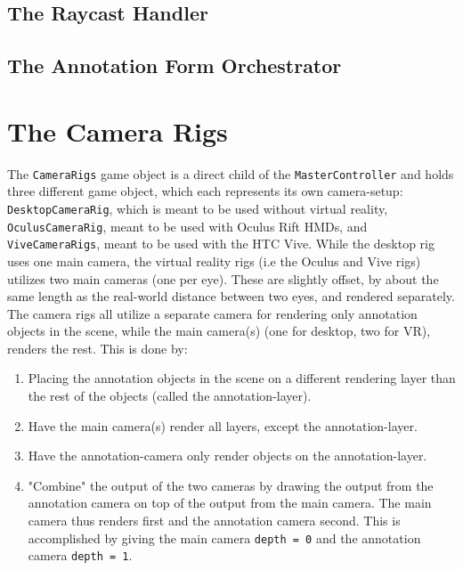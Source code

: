 \subsection{The Raycast Handler}

\subsection{The Annotation Form Orchestrator}



\section{The Camera Rigs}
\label{sec:camera_rigs}
The \texttt{CameraRigs} game object is a direct child of the \texttt{MasterController} and holds three different game object, 
which each represents its own camera-setup: \texttt{DesktopCameraRig}, which is meant to be used
without virtual reality, \texttt{OculusCameraRig}, meant to be used with Oculus Rift HMDs, and \texttt{ViveCameraRigs}, meant to be used with the HTC Vive. 
While the desktop rig uses one main camera, the virtual reality rigs (i.e the Oculus and Vive rigs) utilizes two main cameras (one per eye).
These are slightly offset, by about the same length as the real-world distance between two eyes, and rendered separately.
The camera rigs all utilize a separate camera for rendering only annotation objects in the scene, while the main camera(s) (one for desktop, two for VR), 
renders the rest. %
This is done by:

\begin{enumerate}
	\item Placing the annotation objects in the scene on a different rendering layer than the rest of the objects (called the annotation-layer).
	\item Have the main camera(s) render all layers, except the annotation-layer.
	\item Have the annotation-camera only render objects on the annotation-layer.
	\item "Combine" the output of the two cameras by drawing the output from the annotation camera on top of the output from the main camera. 
		  The main camera thus renders first and the annotation camera second. This is accomplished by giving the main camera \texttt{depth = 0} and the
		  annotation camera \texttt{depth = 1}. 
\end{enumerate}


